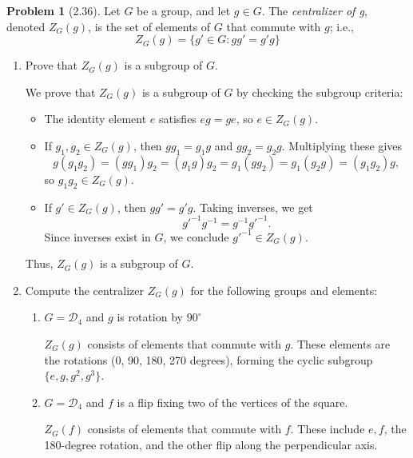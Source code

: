 \documentclass[12pt]{article}
\theoremstyle{definition}
\newtheorem{problem}{Problem}
\begin{document}
\begin{problem}[2.36]
    Let $G$ be a group, and let $g \in G$. The \textit{centralizer of g}, denoted $Z_G(g)$, is the set of elements of $G$ that commute with $g$; i.e.,
    \[Z_G(g) = \{g' \in G: gg' = g'g\}\]
    \begin{enumerate}[label=(\alph*)]
    \item Prove that $Z_G(g)$ is a subgroup of $G$.
    
    \begin{solution}
        We prove that $Z_G(g)$ is a subgroup of $G$ by checking the subgroup criteria:
        \begin{itemize}
            \item The identity element $e$ satisfies $eg = ge$, so $e \in Z_G(g)$.
            \item If $g_1, g_2 \in Z_G(g)$, then $gg_1 = g_1g$ and $gg_2 = g_2g$. Multiplying these gives 
            \[ g(g_1 g_2) = (gg_1) g_2 = (g_1 g) g_2 = g_1 (g g_2) = g_1 (g_2 g) = (g_1 g_2) g, \]
            so $g_1 g_2 \in Z_G(g)$.
            \item If $g' \in Z_G(g)$, then $gg' = g'g$. Taking inverses, we get 
            \[ g'^{-1} g^{-1} = g^{-1} g'^{-1}. \]
            Since inverses exist in $G$, we conclude $g'^{-1} \in Z_G(g)$.
        \end{itemize}
        Thus, $Z_G(g)$ is a subgroup of $G$.
    \end{solution}
    \item Compute the centralizer $Z_G(g)$ for the following groups and elements:
        \begin{enumerate}[label=(\roman*)]
            \item $G = \mathcal{D}_4$ and $g$ is rotation by $90^{\circ}$
            
            \begin{solution}
                $Z_G(g)$ consists of elements that commute with $g$. These elements are the rotations (0, 90, 180, 270 degrees), forming the cyclic subgroup $\{e, g, g^2, g^3\}$.
            \end{solution}
            \item $G = \mathcal{D}_4$ and $f$ is a flip fixing two of the vertices of the square.
            
            \begin{solution}
                $Z_G(f)$ consists of elements that commute with $f$. These include $e, f$, the 180-degree rotation, and the other flip along the perpendicular axis.


\end{solution}
\end{enumerate}
\end{enumerate}
\end{problem}
\end{document}
